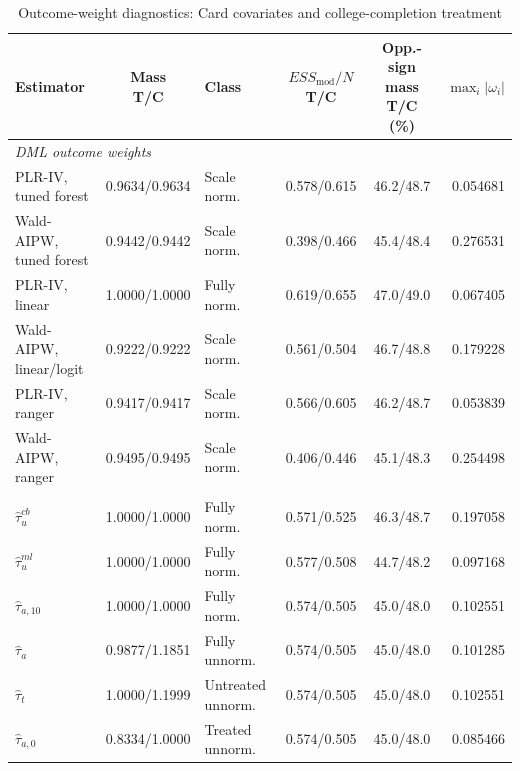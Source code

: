 \documentclass[12pt, a4paper, oneside]{article}
\theoremstyle{plain}
\theoremstyle{definition}
\begin{document}
\begin{table}[H]
    \centering
    \caption{Outcome-weight diagnostics: Card covariates and college-completion treatment}
    \label{tab:card_weights_card_educ16}
    \scriptsize
    \setlength{\tabcolsep}{3pt}
    \renewcommand{\arraystretch}{0.93}
    \begin{tabular}{@{}lclccr@{}}
        \toprule
        Estimator &
        \shortstack{Mass\\T/C} &
        Class &
        \shortstack{$ESS_{\mathrm{mod}}/N$\\T/C} &
        \shortstack{Opp.-sign mass\\T/C (\%)} &
        $\max_i|\omega_i|$ \\
        \midrule
        \multicolumn{6}{l}{\textit{DML outcome weights}} \\
        PLR-IV, tuned forest
            & 0.9634/0.9634 & Scale norm.
            & 0.578/0.615 & 46.2/48.7 & 0.054681 \\
        Wald-AIPW, tuned forest
            & 0.9442/0.9442 & Scale norm.
            & 0.398/0.466 & 45.4/48.4 & 0.276531 \\
        PLR-IV, linear
            & 1.0000/1.0000 & Fully norm.
            & 0.619/0.655 & 47.0/49.0 & 0.067405 \\
        Wald-AIPW, linear/logit
            & 0.9222/0.9222 & Scale norm.
            & 0.561/0.504 & 46.7/48.8 & 0.179228 \\
        PLR-IV, ranger
            & 0.9417/0.9417 & Scale norm.
            & 0.566/0.605 & 46.2/48.7 & 0.053839 \\
        Wald-AIPW, ranger
            & 0.9495/0.9495 & Scale norm.
            & 0.406/0.446 & 45.1/48.3 & 0.254498 \\
        \addlinespace
        \multicolumn{6}{l}{\textit{Kappa outcome weights}} \\
        $\widehat{\tau}^{cb}_{u}$
            & 1.0000/1.0000 & Fully norm.
            & 0.571/0.525 & 46.3/48.7 & 0.197058 \\
        $\widehat{\tau}^{ml}_{u}$
            & 1.0000/1.0000 & Fully norm.
            & 0.577/0.508 & 44.7/48.2 & 0.097168 \\
        $\widehat{\tau}_{a,10}$
            & 1.0000/1.0000 & Fully norm.
            & 0.574/0.505 & 45.0/48.0 & 0.102551 \\
        $\widehat{\tau}_{a}$
            & 0.9877/1.1851 & Fully unnorm.
            & 0.574/0.505 & 45.0/48.0 & 0.101285 \\
        $\widehat{\tau}_{t}$
            & 1.0000/1.1999 & Untreated unnorm.
            & 0.574/0.505 & 45.0/48.0 & 0.102551 \\
        $\widehat{\tau}_{a,0}$
            & 0.8334/1.0000 & Treated unnorm.
            & 0.574/0.505 & 45.0/48.0 & 0.085466 \\
        \bottomrule
    \end{tabular}
\end{table}
\end{document}
